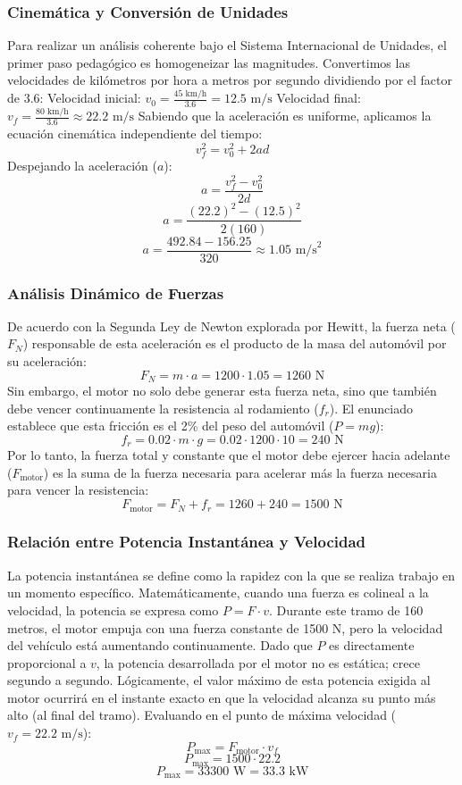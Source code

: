 \documentclass[a4paper,12pt]{article}
\begin{document}
\subsubsection*{Cinemática y Conversión de Unidades}
Para realizar un análisis coherente bajo el Sistema Internacional de Unidades, el primer paso pedagógico es homogeneizar las magnitudes. Convertimos las velocidades de kilómetros por hora a metros por segundo dividiendo por el factor de 3.6:
Velocidad inicial: $v_0 = \frac{45\text{ km/h}}{3.6} = 12.5\text{ m/s}$
Velocidad final: $v_f = \frac{80\text{ km/h}}{3.6} \approx 22.2\text{ m/s}$
Sabiendo que la aceleración es uniforme, aplicamos la ecuación cinemática independiente del tiempo:
$$v_f^2 = v_0^2 + 2 a d$$
Despejando la aceleración ($a$):
$$a = \frac{v_f^2 - v_0^2}{2d}$$
$$a = \frac{(22.2)^2 - (12.5)^2}{2(160)}$$
$$a = \frac{492.84 - 156.25}{320} \approx 1.05\text{ m/s}^2$$

\subsubsection*{Análisis Dinámico de Fuerzas}
De acuerdo con la Segunda Ley de Newton explorada por Hewitt, la fuerza neta ($F_N$) responsable de esta aceleración es el producto de la masa del automóvil por su aceleración:
$$F_N = m \cdot a = 1200 \cdot 1.05 = 1260\text{ N}$$
Sin embargo, el motor no solo debe generar esta fuerza neta, sino que también debe vencer continuamente la resistencia al rodamiento ($f_r$). El enunciado establece que esta fricción es el 2\% del peso del automóvil ($P = mg$):
$$f_r = 0.02 \cdot m \cdot g = 0.02 \cdot 1200 \cdot 10 = 240\text{ N}$$
Por lo tanto, la fuerza total y constante que el motor debe ejercer hacia adelante ($F_{\text{motor}}$) es la suma de la fuerza necesaria para acelerar más la fuerza necesaria para vencer la resistencia:
$$F_{\text{motor}} = F_N + f_r = 1260 + 240 = 1500\text{ N}$$

\subsubsection*{Relación entre Potencia Instantánea y Velocidad}
La potencia instantánea se define como la rapidez con la que se realiza trabajo en un momento específico. Matemáticamente, cuando una fuerza es colineal a la velocidad, la potencia se expresa como $P = F \cdot v$.
Durante este tramo de 160 metros, el motor empuja con una fuerza constante de 1500 N, pero la velocidad del vehículo está aumentando continuamente. Dado que $P$ es directamente proporcional a $v$, la potencia desarrollada por el motor no es estática; crece segundo a segundo. Lógicamente, el valor máximo de esta potencia exigida al motor ocurrirá en el instante exacto en que la velocidad alcanza su punto más alto (al final del tramo).
Evaluando en el punto de máxima velocidad ($v_f = 22.2\text{ m/s}$):
$$P_{\text{max}} = F_{\text{motor}} \cdot v_f$$
$$P_{\text{max}} = 1500 \cdot 22.2$$
$$P_{\text{max}} = 33300\text{ W} = 33.3\text{ kW}$$
\end{document}
